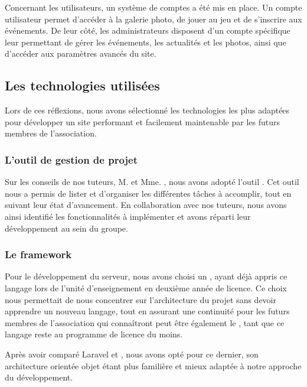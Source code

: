 Concernant les utilisateurs, un système de comptes a été mis en place. Un compte utilisateur permet d’accéder à la galerie photo, de jouer au jeu et de s’inscrire aux événements. De leur côté, les administrateurs disposent d’un compte spécifique leur permettant de gérer les événements, les actualités et les photos, ainsi que d’accéder aux paramètres avancés du site.

\subsection{Les technologies utilisées}

Lors de ces réflexions, nous avons sélectionné les technologies les plus adaptées pour développer un site performant et facilement maintenable par les futurs membres de l’association.

\subsubsection*{L'outil de gestion de projet }

Sur les conseils de nos tuteurs, M.  et Mme. , nous avons adopté l’outil . Cet outil nous a permis de lister et d’organiser les différentes tâches à accomplir, tout en suivant leur état d'avancement. En collaboration avec nos tuteurs, nous avons ainsi identifié les fonctionnalités à implémenter et avons réparti leur développement au sein du groupe.

\subsubsection*{Le framework }

Pour le développement du serveur, nous avons choisi un  , ayant déjà appris ce langage lors de l’unité d’enseignement  en deuxième année de licence. Ce choix nous permettait de nous concentrer sur l’architecture du projet sans devoir apprendre un nouveau langage, tout en assurant une continuité pour les futurs membres de l’association qui connaîtront peut être également le , tant que ce langage reste au programme de licence du moins.

Après avoir comparé Laravel et , nous avons opté pour ce dernier, son architecture orientée objet étant plus familière et mieux adaptée à notre approche du développement.

